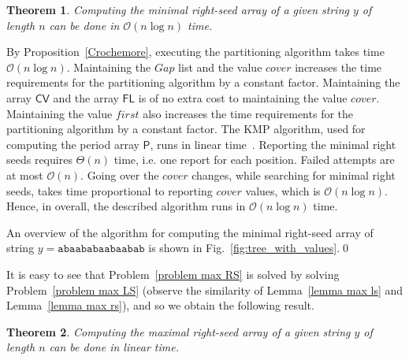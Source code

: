 \documentclass[preprint,12pt]{elsarticle}
\newcommand{\parr}{\textsf{P}}      %
\newcommand{\cv}{\textsf{CV}}
\newcommand{\fl}{\textsf{FL}}
\newcommand{\cO}{\ensuremath{\mathcal{O}}}
\newcommand{\gaplist}{\ensuremath{\mathit{Gap}}}
\newcommand{\covervalue}{\ensuremath{\mathit{cover}}}
\newcommand{\firstvalue}{\ensuremath{\mathit{first}}}
\newtheorem{theorem}{Theorem}[section]
\newenvironment{proof}[1][Proof]{\begin{trivlist}
\item[\hskip \labelsep {\bfseries #1}]}{\end{trivlist}}
\newenvironment{example}[1][Example]{\begin{trivlist}
\item[\hskip \labelsep {\bfseries #1}]}{\end{trivlist}}
\begin{document}
\begin{theorem}
Computing the minimal right-seed array of a given string $y$ of length $n$ can be done in $\cO(n\log n)$ time.
\end{theorem}

\begin{proof}
By Proposition~\ref{Crochemore}, executing the partitioning algorithm takes time $\cO(n\log n)$.
Maintaining the $\gaplist$ list and the value $\covervalue$ increases the time requirements for the partitioning algorithm by a constant factor.
Maintaining the array $\cv$ and the array $\fl$ is of no extra cost to maintaining the value $\covervalue$.
Maintaining the value $\firstvalue$ also increases the time requirements for the partitioning algorithm by a constant factor.
The KMP algorithm, used for computing the period array $\parr$, runs in linear time~\cite{KMP}.
Reporting the minimal right seeds requires $\Theta(n)$ time, i.e. one report for each position. Failed attempts are at most $\cO(n)$.
Going over the $\covervalue$ changes, while searching for minimal right seeds, takes time proportional to reporting $\covervalue$ values,
which is $\cO(n\log n)$. Hence, in overall, the described algorithm runs in $\cO(n\log n)$ time.
\hfill
\end{proof}

\begin{example}
An overview of the algorithm for computing the minimal right-seed array of string $y=\texttt{abaababaabaabab}$ 
is shown in Fig.~\ref{fig:tree_with_values}.\qed
\end{example}

It is easy to see that Problem~\ref{problem max RS} is solved by solving Problem~\ref{problem max LS} 
(observe the similarity of Lemma~\ref{lemma max ls} and Lemma~\ref{lemma max rs}), and so we obtain the following result.

\begin{theorem}
Computing the maximal right-seed array of a given string $y$ of length $n$ can be done in linear time.
\end{theorem}
\end{document}
